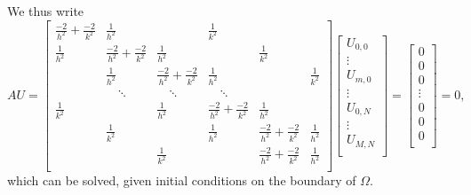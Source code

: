 We thus write
\begin{equation*}
    \renewcommand{\arraystretch}{2.5} %
    AU = 
    \begin{bmatrix}
        \frac{-2}{h^2} + \frac{-2}{k^2} & \frac{1}{h^2} &&\frac{1}{k^2}\\
        \frac{1}{h^2} & \frac{-2}{h^2} + \frac{-2}{k^2}   & \frac{1}{h^2} &&\frac{1}{k^2}\\
        & \frac{1}{h^2} & \frac{-2}{h^2} + \frac{-2}{k^2}   & \frac{1}{h^2} &&\frac{1}{k^2}\\
        &  \quad \ddots & \quad \ddots  & \quad \ddots \\
        \frac{1}{k^2} && \frac{1}{h^2} & \frac{-2}{h^2} + \frac{-2}{k^2} & \frac{1}{h^2} \\
        & \frac{1}{k^2} && \frac{1}{h^2} & \frac{-2}{h^2} + \frac{-2}{k^2}   & \frac{1}{h^2} \\
        && \frac{1}{k^2} && \frac{-2}{h^2} + \frac{-2}{k^2} & \frac{1}{h^2} \\
    \end{bmatrix}
    \begin{bmatrix}
    U_{0,0} \\ \vdots \\ U_{m,0} \\ \vdots \\ U_{0,N} \\ \vdots \\ U_{M,N} \\
    \end{bmatrix}
    =
    \begin{bmatrix}
    0 \\ 0 \\ 0 \\ \vdots \\ 0 \\ 0 \\ 0 \\
    \end{bmatrix}
    = 0,
    \label{ex3:eq:solution_equation}
\end{equation*}
which can be solved, given initial conditions on the boundary of $\Omega$.
